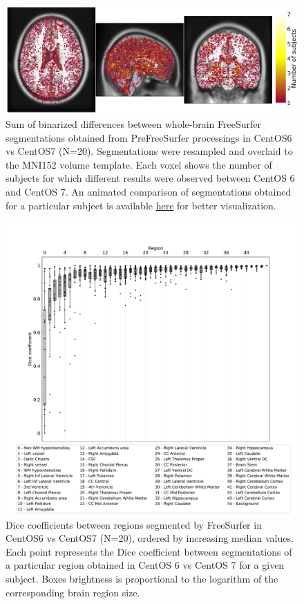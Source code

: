 \begin{figure}
\centering
  \includegraphics[width=\columnwidth]{chapters/chapter1/figures/brain_segmentation_mni.png}
  \caption{Sum of binarized differences between whole-brain FreeSurfer
  segmentations obtained from PreFreeSurfer processings in CentOS6 vs CentOS7
   (N=20). Segmentations were resampled and overlaid to the MNI152 volume
  template.
  Each voxel shows the number of subjects for which different results were observed between CentOS 6 and CentOS 7.
  An animated comparison of segmentations obtained for a particular subject is available
\href{https://github.com/big-data-lab-team/HCP-reproducibility-paper/blob/master/figures/fs_brain_segmentation.gif}
{here} for better visualization.}
  \label{fig:tissue_class}
\end{figure}

\begin{figure}
  \hspace*{-1cm}
  \includegraphics[width=1.1\linewidth]{chapters/chapter1/figures/dice_regions.pdf}
    \caption{Dice coefficients between regions segmented by FreeSurfer in CentOS6 vs CentOS7 (N=20), ordered by increasing
    median values.
    Each point represents the Dice coefficient between segmentations of a particular region obtained in CentOS 6 vs CentOS 7 for a given subject.
    Boxes brightness is proportional to the logarithm of the corresponding brain region size.}
    \label{fig:scatter_plot}
  \end{figure}

